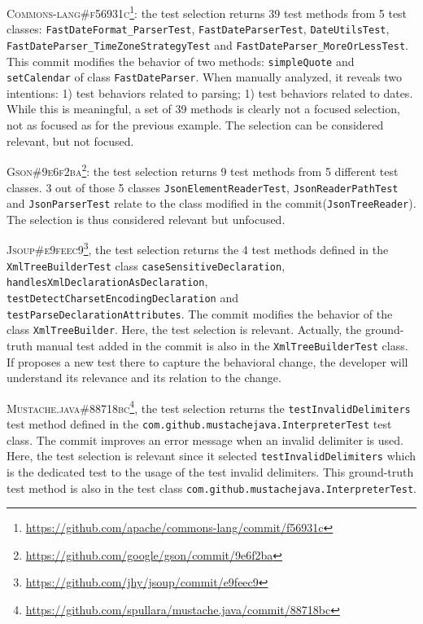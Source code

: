 \textsc{Commons-lang\#f56931c}\footnote{\url{https://github.com/apache/commons-lang/commit/f56931c}}: the test selection returns 39 test methods from 5 test classes: \texttt{FastDateFormat\_ParserTest}, \texttt{FastDateParserTest}, \texttt{DateUtilsTest}, \texttt{FastDateParser\_TimeZoneStrategyTest} and \texttt{FastDateParser\_MoreOrLessTest}.
This commit modifies the behavior of two methods: \texttt{simpleQuote} and \texttt{setCalendar} of class \texttt{FastDateParser}.
When manually analyzed, it reveals two intentions:
1) test behaviors related to parsing;
1) test behaviors related to dates.
While this is meaningful, a set of 39 methods is clearly not a focused selection, not as focused as for the previous example.
The selection can be considered relevant, but not focused.

\textsc{Gson\#9e6f2ba}\footnote{\url{https://github.com/google/gson/commit/9e6f2ba}}: the test selection returns 9 test methods from 5 different test classes.
3 out of those 5 classes \texttt{JsonElementReaderTest}, \texttt{JsonReaderPathTest} and \texttt{JsonParserTest} relate to the class modified in the commit(\texttt{JsonTreeReader}).
The selection is thus considered relevant but unfocused.

\textsc{Jsoup\#e9feec9}\footnote{\url{https://github.com/jhy/jsoup/commit/e9feec9}}, the test selection returns the 4 test methods defined in the \texttt{XmlTreeBuilderTest} class \texttt{caseSensitiveDeclaration}, \texttt{handlesXmlDeclarationAsDeclaration}, \texttt{testDetectCharsetEncodingDeclaration} and \texttt{testParseDeclarationAttributes}.
The commit modifies the behavior of the class \texttt{XmlTreeBuilder}.
Here, the test selection is relevant.
Actually, the ground-truth manual test added in the commit is also in the \texttt{XmlTreeBuilderTest} class.
If \DCI proposes a new test there to capture the behavioral change, the developer will understand its relevance and its relation to the change.

\textsc{Mustache.java\#88718bc}\footnote{\url{https://github.com/spullara/mustache.java/commit/88718bc}}, the test selection returns the \texttt{testInvalidDelimiters} test method defined in the \texttt{com.github.mustachejava.InterpreterTest} test class.
The commit improves an error message when an invalid delimiter is used.
Here, the test selection is relevant since it selected \texttt{testInvalidDelimiters} which is the dedicated test to the usage of the test invalid delimiters.
This ground-truth test method is also in the test class \texttt{com.github.mustachejava.InterpreterTest}.

